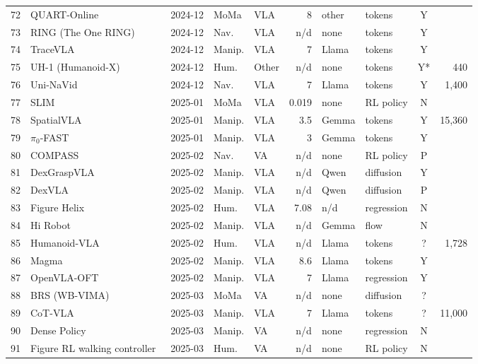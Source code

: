 \begin{longtable}{@{}r p{3.55cm} l l l r l l c r@{}}
72 & QUART-Online~\cite{ax241215576} & 2024-12 & MoMa & VLA & 8 & other & tokens & Y & \\
73 & RING (The One RING)~\cite{ax241214401} & 2024-12 & Nav. & VLA & n/d & none & tokens & Y & \\
74 & TraceVLA~\cite{ax241210345} & 2024-12 & Manip. & VLA & 7 & Llama & tokens & Y & \\
75 & UH-1 (Humanoid-X)~\cite{ax241214172} & 2024-12 & Hum. & Other & n/d & none & tokens & Y* & 440\\
76 & Uni-NaVid~\cite{ax241206224} & 2024-12 & Nav. & VLA & 7 & Llama & tokens & Y & 1,400\\
77 & SLIM~\cite{ax250109905} & 2025-01 & MoMa & VLA & 0.019 & none & RL policy & N & \\
78 & SpatialVLA~\cite{ax250115830} & 2025-01 & Manip. & VLA & 3.5 & Gemma & tokens & Y & 15,360\\
79 & $\pi_0$-FAST~\cite{ax250109747} & 2025-01 & Manip. & VLA & 3 & Gemma & tokens & Y & \\
80 & COMPASS~\cite{ax250216372} & 2025-02 & Nav. & VA & n/d & none & RL policy & P & \\
81 & DexGraspVLA~\cite{ax250220900} & 2025-02 & Manip. & VLA & n/d & Qwen & diffusion & Y & \\
82 & DexVLA~\cite{ax250205855} & 2025-02 & Manip. & VLA & n/d & Qwen & diffusion & P & \\
83 & Figure Helix~\cite{web-figure-helix} & 2025-02 & Hum. & VLA & 7.08 & n/d & regression & N & \\
84 & Hi Robot~\cite{ax250219417} & 2025-02 & Manip. & VLA & n/d & Gemma & flow & N & \\
85 & Humanoid-VLA~\cite{ax250214795} & 2025-02 & Hum. & VLA & n/d & Llama & tokens & ? & 1,728\\
86 & Magma~\cite{ax250213130} & 2025-02 & Manip. & VLA & 8.6 & Llama & tokens & Y & \\
87 & OpenVLA-OFT~\cite{ax250219645} & 2025-02 & Manip. & VLA & 7 & Llama & regression & Y & \\
88 & BRS (WB-VIMA)~\cite{ax250305652} & 2025-03 & MoMa & VA & n/d & none & diffusion & ? & \\
89 & CoT-VLA~\cite{ax250322020} & 2025-03 & Manip. & VLA & 7 & Llama & tokens & ? & 11,000\\
90 & Dense Policy~\cite{ax250313217} & 2025-03 & Manip. & VA & n/d & none & regression & N & \\
91 & Figure RL walking controller~\cite{web-figure-rl} & 2025-03 & Hum. & VA & n/d & none & RL policy & N & \\

\end{longtable}
